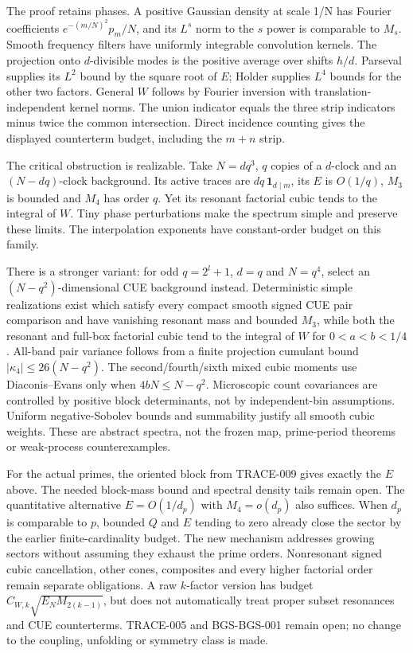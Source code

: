The proof retains phases. A positive Gaussian density at scale 1/N has
Fourier coefficients \(e^{-(m/N)^2}p_m/N\), and its \(L^s\) norm to the \(s\) power
is comparable to \(M_s\). Smooth frequency filters have uniformly integrable
convolution kernels. The projection onto \(d\)-divisible modes is the positive
average over shifts \(h/d\). Parseval supplies its \(L^2\) bound by the square root
of \(E\); Holder supplies \(L^4\) bounds for the other two factors. General \(W\) follows
by Fourier inversion with translation-independent kernel norms. The union
indicator equals the three strip indicators minus twice the common
intersection. Direct incidence counting gives the displayed counterterm
budget, including the \(m+n\) strip.

The critical obstruction is realizable. Take \(N=dq^3\), \(q\) copies of a \(d\)-clock
and an \((N-dq)\)-clock background. Its active traces are
\(dq\,\mathbf1_{d\mid m}\), its \(E\) is \(O(1/q)\), \(M_3\) is bounded and \(M_4\) has order \(q\).
Yet its resonant factorial cubic tends to the integral of \(W\). Tiny phase
perturbations make the spectrum simple and preserve these limits.
The interpolation exponents have constant-order budget on this family.

There is a stronger variant: for odd \(q=2^l+1\), \(d=q\) and \(N=q^4\), select
an \((N-q^2)\)-dimensional CUE background instead. Deterministic simple
realizations exist which satisfy every compact smooth signed CUE pair
comparison and have vanishing resonant mass and bounded \(M_3\), while both
the resonant and full-box factorial cubic tend to the integral of \(W\) for
\(0<a<b<1/4\). All-band pair variance follows from a finite projection
cumulant bound \(|\kappa_4|\le26(N-q^2)\). The second/fourth/sixth mixed
cubic moments use Diaconis--Evans only when \(4bN\le N-q^2\).
Microscopic count covariances are controlled by positive block determinants,
not by independent-bin assumptions. Uniform negative-Sobolev bounds and
summability justify all smooth cubic weights. These are abstract spectra,
not the frozen map, prime-period theorems or weak-process counterexamples.

For the actual primes, the oriented block from TRACE-009 gives exactly
the \(E\) above. The needed block-mass bound and spectral density tails remain
open. The quantitative alternative \(E=O(1/d_p)\) with \(M_4=o(d_p)\) also suffices.
When \(d_p\) is comparable to \(p\), bounded \(Q\) and \(E\) tending to zero already close
the sector by the earlier finite-cardinality budget. The new mechanism
addresses growing sectors without assuming they exhaust the prime orders.
Nonresonant signed cubic cancellation, other cones, composites and every
higher factorial order remain separate obligations. A raw \(k\)-factor version
has budget \(C_{W,k}\sqrt{E_N M_{2(k-1)}}\), but does not automatically treat
proper subset resonances and CUE counterterms. TRACE-005 and BGS-BGS-001
remain open; no change to the coupling, unfolding or symmetry class is made.

